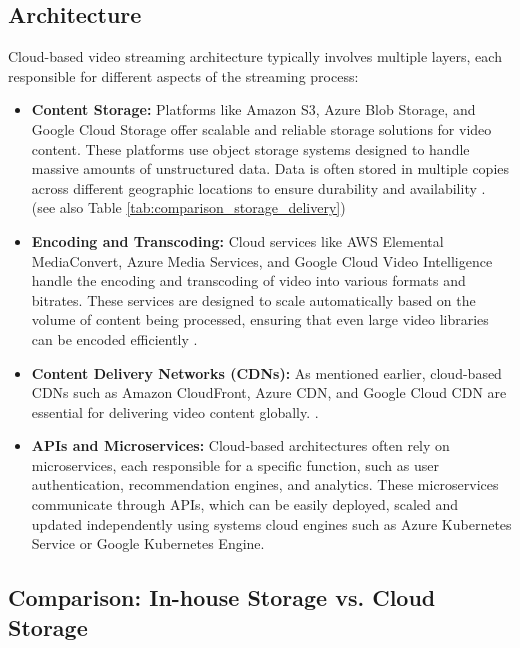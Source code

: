 \subsection{Architecture}
Cloud-based video streaming architecture typically involves multiple layers, each responsible for different aspects of the streaming process:

\begin{itemize}
    \item \textbf{Content Storage:} Platforms like Amazon S3, Azure Blob Storage, and Google Cloud Storage offer scalable and reliable storage solutions for video content. These platforms use object storage systems designed to handle massive amounts of unstructured data. Data is often stored in multiple copies across different geographic locations to ensure durability and availability \cite{cloud_storage_video}. (see also Table \autoref{tab:comparison_storage_delivery})
    
    \item \textbf{Encoding and Transcoding:} Cloud services like AWS Elemental MediaConvert, Azure Media Services, and Google Cloud Video Intelligence handle the encoding and transcoding of video into various formats and bitrates. These services are designed to scale automatically based on the volume of content being processed, ensuring that even large video libraries can be encoded efficiently \cite{cloud_transcoding_video}.
    
    \item \textbf{Content Delivery Networks (CDNs):} As mentioned earlier, cloud-based \ac{CDN}s such as Amazon CloudFront, Azure CDN, and Google Cloud CDN are essential for delivering video content globally. \cite{cloud_cdn_video}.
    
    \item \textbf{\ac{API}s and Microservices:} Cloud-based architectures often rely on microservices, each responsible for a specific function, such as user authentication, recommendation engines, and analytics. These microservices communicate through \ac{API}s, which can be easily deployed, scaled and updated independently using systems cloud engines such as Azure Kubernetes Service or Google Kubernetes Engine\cite{microservices_video}.
\end{itemize}

\subsection{Comparison: In-house Storage vs. Cloud Storage}

